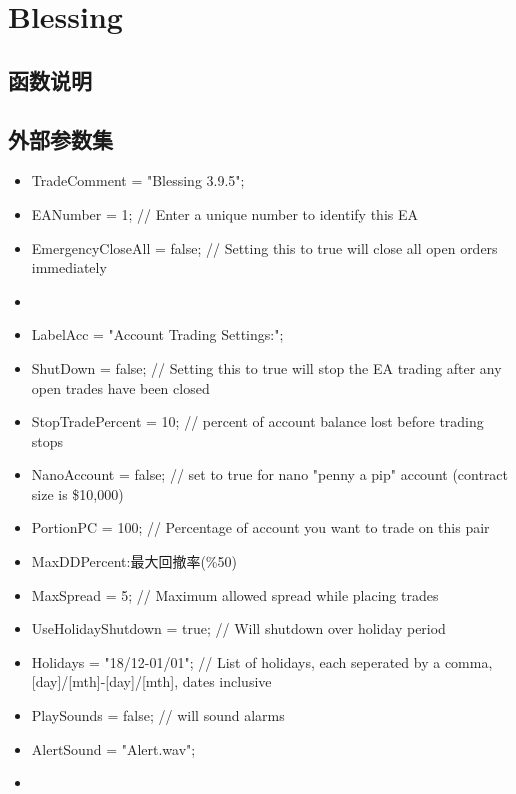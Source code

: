 \chapter{Blessing}




 
\section{函数说明}



\section{外部参数集}
\begin{itemize}


\item TradeComment        = "Blessing 3.9.5";
\item EANumber            = 1;        // Enter a unique number to identify this EA
\item EmergencyCloseAll   = false;    // Setting this to true will close all open orders immediately
\item 
\item LabelAcc            = "Account Trading Settings:";
\item ShutDown            = false;    // Setting this to true will stop the EA trading after any open trades have been closed
\item StopTradePercent    = 10;       // percent of account balance lost before trading stops
\item NanoAccount         = false;    // set to true for nano "penny a pip" account (contract size is \$10,000)
\item PortionPC           = 100;      // Percentage of account you want to trade on this pair
\item MaxDDPercent:最大回撤率(\%50)
\item MaxSpread           = 5;        // Maximum allowed spread while placing trades
\item UseHolidayShutdown  = true;     // Will shutdown over holiday period
\item Holidays            = "18/12-01/01"; // List of holidays, each seperated by a comma, [day]/[mth]-[day]/[mth], dates inclusive
\item PlaySounds          = false;    // will sound alarms
\item AlertSound          = "Alert.wav";
\item 

\end{itemize}
